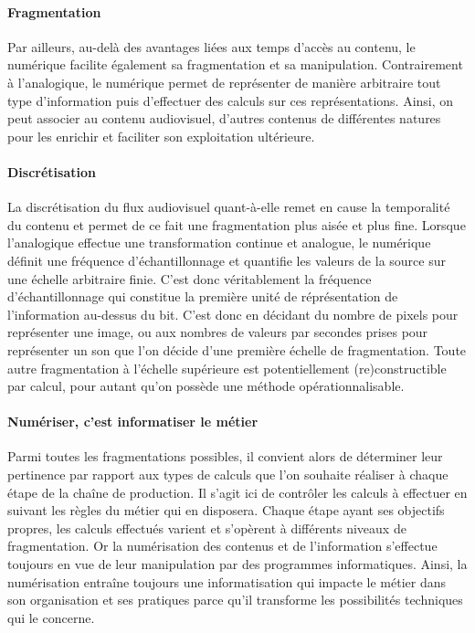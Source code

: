 \paragraph{Fragmentation}
Par ailleurs, au-delà des avantages liées aux temps d'accès au contenu, le numérique facilite également sa fragmentation et sa manipulation.
Contrairement à l'analogique, le numérique permet de représenter de manière arbitraire tout type d'information puis d'effectuer des calculs sur ces représentations. 
Ainsi, on peut associer au contenu audiovisuel, d'autres contenus de différentes natures pour les enrichir et faciliter son exploitation ultérieure.

\paragraph{Discrétisation}
La discrétisation du flux audiovisuel quant-à-elle remet en cause la temporalité du contenu et permet de ce fait une fragmentation plus aisée et plus fine. 
Lorsque l'analogique effectue une transformation continue et analogue, le numérique définit une fréquence d'échantillonnage et quantifie les valeurs de la source sur une échelle arbitraire finie. 
C'est donc véritablement la fréquence d'échantillonnage qui constitue la première unité de réprésentation de l'information au-dessus du bit.
C'est donc en décidant du nombre de pixels pour représenter une image, ou aux nombres de valeurs par secondes prises pour représenter un son que l'on décide d'une première échelle de fragmentation. 
Toute autre fragmentation à l'échelle supérieure est potentiellement (re)constructible par calcul, pour autant qu'on possède une méthode opérationnalisable. 

\paragraph{Numériser, c'est informatiser le métier}
Parmi toutes les fragmentations possibles, il convient alors de déterminer leur pertinence par rapport aux types de calculs que l'on souhaite réaliser à chaque étape de la chaîne de production. 
Il s'agit ici de contrôler les calculs à effectuer en suivant les règles du métier qui en disposera.
Chaque étape ayant ses objectifs propres, les calculs effectués varient et s'opèrent à différents niveaux de fragmentation. 
Or la numérisation des contenus et de l'information s'effectue toujours en vue de leur manipulation par des programmes informatiques.
Ainsi, la numérisation entraîne toujours une informatisation qui impacte le métier dans son organisation et ses pratiques parce qu'il transforme les possibilités techniques qui le concerne.



